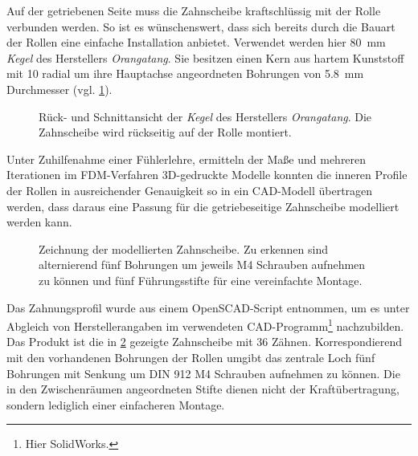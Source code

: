 		Auf der getriebenen Seite muss die Zahnscheibe kraftschlüssig mit der Rolle verbunden werden.
		So ist es wünschenswert, dass sich bereits durch die Bauart der Rollen eine einfache Installation anbietet.
		Verwendet werden hier \qty{80}{\milli\metre} \textit{Kegel} des Herstellers \textit{Orangatang}.
		Sie besitzen einen Kern aus hartem Kunststoff mit 10 radial um ihre Hauptachse angeordneten Bohrungen von \qty{5,8}{\milli\metre} Durchmesser (vgl. \cref{fig:kegels}).
		\begin{figure}[h]
			\centering
			
			\caption[Rück- und Schnittansicht der \textit{Kegel} des Herstellers \textit{Orangatang}]{Rück- und Schnittansicht der \textit{Kegel} des Herstellers \textit{Orangatang}. Die Zahnscheibe wird rückseitig auf der Rolle montiert.}
			\label{fig:kegels}
		\end{figure}
		Unter Zuhilfenahme einer Fühlerlehre, ermitteln der Maße und mehreren Iterationen im FDM-Verfahren 3D-gedruckte Modelle konnten die inneren Profile der Rollen in ausreichender Genauigkeit so in ein CAD-Modell übertragen werden, dass daraus eine Passung für die getriebeseitige Zahnscheibe modelliert werden kann.
		\begin{figure}[h]
			\centering
			
			\caption[Zeichnung der modellierten Zahnscheibe]{Zeichnung der modellierten Zahnscheibe. Zu erkennen sind alternierend fünf Bohrungen um jeweils M4 Schrauben aufnehmen zu können und fünf Führungsstifte für eine vereinfachte Montage.}
			\label{fig:htd 5m driven}
		\end{figure}

		Das Zahnungsprofil wurde aus einem OpenSCAD-Script\cite{thingiverse.tooth.profiles.2012} entnommen, um es unter Abgleich von Herstellerangaben\cite{gates.catalogue.2021,GatesCorporation.drive.design.manual.2014} im verwendeten CAD-Programm\footnote{Hier SolidWorks.} nachzubilden.
		Das Produkt ist die in \cref{fig:htd 5m driven} gezeigte Zahnscheibe mit 36 Zähnen.
		Korrespondierend mit den vorhandenen Bohrungen der Rollen umgibt das zentrale Loch fünf Bohrungen mit Senkung um DIN 912 M4 Schrauben aufnehmen zu können.
		Die in den Zwischenräumen angeordneten Stifte dienen nicht der Kraftübertragung, sondern lediglich einer einfacheren Montage.
		
